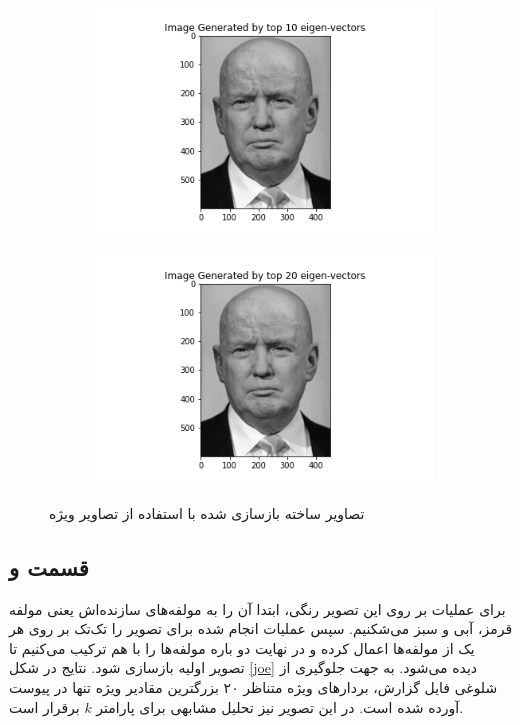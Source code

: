 \documentclass{article}
\begin{document}
\begin{figure}[h]
\begin{subfigure}{0.2\linewidth}
        \centering
        \includegraphics[scale=0.2]{images/q4/donald/donald_10.png}
    \end{subfigure}
    \hfill
    \begin{subfigure}{0.2\linewidth}
        \centering
        \includegraphics[scale=0.2]{images/q4/donald/donald_20.png}
    \end{subfigure}
    \caption{تصاویر ساخته بازسازی شده با استفاده از تصاویر ویژه}
    \label{donald}
\end{figure}

\subsection*{قسمت و}

برای عملیات بر روی این تصویر رنگی، ابتدا آن را به مولفه‌های سازنده‌اش یعنی مولفه قرمز، آبی و سبز می‌شکنیم. سپس
عملیات انجام شده برای تصویر  را تک‌تک بر روی هر یک از مولفه‌ها اعمال کرده و در نهایت دو باره
مولفه‌ها را با هم ترکیب می‌کنیم تا تصویر اولیه بازسازی شود. نتایج در شکل \ref{joe} دیده می‌شود. به جهت جلوگیری از
شلوغی فایل گزارش، بردار‌های ویژه متناظر
۲۰ بزرگترین مقادیر ویژه تنها در  پیوست آورده شده است. در این تصویر نیز تحلیل مشابهی برای پارامتر
$k$ برقرار است.
\end{document}
